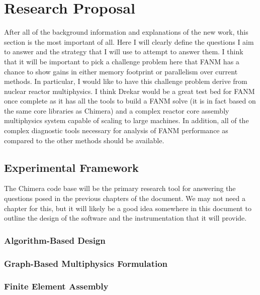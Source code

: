\chapter{Research Proposal}
\label{ch:research_proposal}

After all of the background information and explanations of the new
work, this section is the most important of all. Here I will clearly
define the questions I aim to answer and the strategy that I will use
to attempt to answer them. I think that it will be important to pick a
challenge problem here that FANM has a chance to show gains in either
memory footprint or parallelism over current methods. In particular, I
would like to have this challenge problem derive from nuclear reactor
multiphysics. I think Drekar would be a great test bed for FANM once
complete as it has all the tools to build a FANM solve (it is in fact
based on the same core libraries as Chimera) and a complex reactor
core assembly multiphysics system capable of scaling to large
machines. In addition, all of the complex diagnostic tools necessary
for analysis of FANM performance as compared to the other methods
should be available. 

\section{Experimental Framework}
\label{sec:experimental_framework}

The Chimera code base will be the primary research tool for answering
the questions posed in the previous chapters of the document. We may
not need a chapter for this, but it will likely be a good idea
somewhere in this document to outline the design of the software and
the instrumentation that it will provide.

\subsection{Algorithm-Based Design}
\label{subsec:chimera_design}

\subsection{Graph-Based Multiphysics Formulation}
\label{subsec:multiphysics_graph}

\subsection{Finite Element Assembly}
\label{subsec:fem_assembly}

